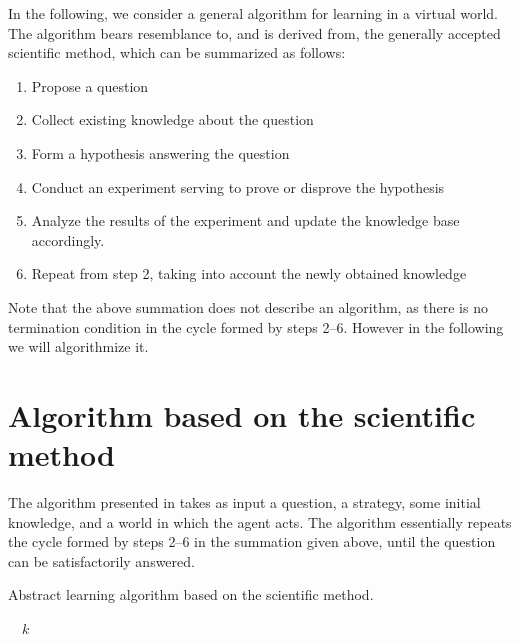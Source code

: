 \documentclass[\master/Master.tex]{subfiles}
\begin{document}
In the following, we consider a general algorithm for learning in a virtual world. The algorithm bears resemblance to, and is derived from, the generally accepted scientific method, which can be summarized as follows:

\begin{enumerate}
    \item Propose a question
    \item Collect existing knowledge about the question
    \item Form a hypothesis answering the question
    \item Conduct an experiment serving to prove or disprove the hypothesis
    \item Analyze the results of the experiment and update the knowledge base accordingly.
    \item Repeat from step 2, taking into account the newly obtained knowledge
\end{enumerate}

Note that the above summation does not describe an algorithm, as there is no termination condition in the cycle formed by steps 2--6. However in the following we will algorithmize it.

\section{Algorithm based on the scientific method}

The algorithm presented in  takes as input a question, a strategy, some initial knowledge, and a world in which the agent acts. The algorithm essentially repeats the cycle formed by steps 2--6 in the summation given above, until the question can be satisfactorily answered.


\begin{algorithm}
    \caption{Abstract learning algorithm based on the scientific method.}\label{algo:science}

    \begin{algorithmic}
                \Else%
                \EndIf%
            \EndWhile%
            \State~\Return~$k$
        \EndFunction%
    \end{algorithmic}
\end{algorithm}
\end{document}

